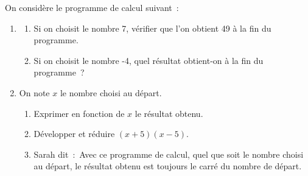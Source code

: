 \documentclass[exercice,a4]{thedocument}%
\begin{document}
%
On considère le programme de calcul suivant~:\par
\begin{center}
\end{center}
\begin{enumerate}
    \item \begin{enumerate}
        \item Si on choisit le nombre 7, vérifier que l'on obtient 49
        à la fin du programme.
        \item Si on choisit le nombre -4, quel résultat obtient-on à
        la fin du programme~?
    \end{enumerate}
    \item On note $x$ le nombre choisi au départ.
    \begin{enumerate}
        \item Exprimer en fonction de $x$ le résultat obtenu.
        \item Développer et réduire $(x+5)(x-5)$.
        \item Sarah dit~:\guillemotleft\ Avec ce programme de calcul, quel
        que soit le nombre choisi au départ, le résultat obtenu est toujours
        le carré du nombre de départ.
        \guillemotright
    \end{enumerate}
\end{enumerate}
\showthesource
\end{document}
